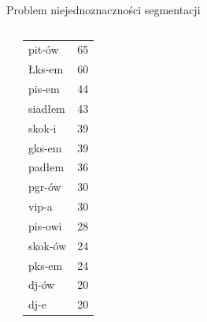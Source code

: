 \documentclass{beamer}
\begin{document}
\begin{frame}{Problem niejednoznaczności segmentacji}
\begin{columns}[c]
\begin{center}
\begin{tabular}{l|r}
      \end{tabular}
    \end{center}
    \begin{center}
      \footnotesize
      \begin{tabular}{l|r}
        pit-ów & 65 \\
        Łks-em & 60 \\
        pis-em & 44 \\
        siadłem & 43 \\
        skok-i & 39 \\
        gks-em & 39 \\
        padłem & 36 \\
        pgr-ów & 30 \\
        vip-a & 30 \\
        pis-owi & 28 \\
        skok-ów & 24 \\
        pks-em & 24 \\
        dj-ów & 20 \\
        dj-e & 20 \\
      \end{tabular}
    \end{center}
  \end{columns}
\end{frame}
\end{document}
